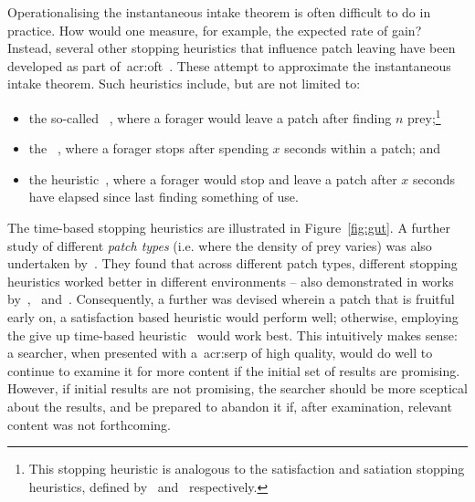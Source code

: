 Operationalising the instantaneous intake theorem is often difficult to do in practice. How would one measure, for example, the expected rate of gain? Instead, several other stopping heuristics that influence patch leaving have been developed as part of~\gls{acr:oft}~\citep{stephens1986foraging_theory}. These attempt to approximate the instantaneous intake theorem. Such heuristics include, but are not limited to:

\begin{itemize}
    \item{the so-called ~\citep{gibb1958number_rule}, where a forager would leave a patch after finding $n$ prey;\footnote{This stopping heuristic is analogous to the satisfaction and satiation stopping heuristics, defined by~\cite{cooper1973retrieval_effectiveness} and~\cite{simon1955satiation} respectively.}}
    
    \item{the ~\citep{charles1972behaviour, krebs1973time_rule}, where a forager stops after spending $x$ seconds within a patch; and}
    
    \item{the  heuristic~\citep{krebs1974leave_after_rule}, where a forager would stop and leave a patch after $x$ seconds have elapsed since last finding something of use.}
\end{itemize}

The time-based stopping heuristics are illustrated in Figure~\ref{fig:gut}. A further study of different \emph{patch types} (i.e. where the density of prey varies) was also undertaken by~\cite{mcnair1982gut_mvt}. They found that across different patch types, different stopping heuristics worked better in different environments -- also demonstrated in works by~\cite{iwasa1981prey_distribution},~\cite{mcnair1982gut_mvt} and~\cite{green1984oft_stopping}. Consequently, a further  was devised wherein a patch that is fruitful early on, a satisfaction based heuristic would perform well; otherwise, employing the give up time-based heuristic~\citep{krebs1974leave_after_rule} would work best. This intuitively makes sense: a searcher, when presented with a~\gls{acr:serp} of high quality, would do well to continue to examine it for more content if the initial set of results are promising. However, if initial results are not promising, the searcher should be more sceptical about the results, and be prepared to abandon it if, after examination, relevant content was not forthcoming.

